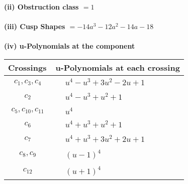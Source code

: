 \documentclass[1p]{elsarticle_modified}
\theoremstyle{definition}
\begin{document}
\flushleft \textbf{(ii) Obstruction class $= 1$}\\~\\
\flushleft \textbf{(iii) Cusp Shapes $= -14 a^3-12 a^2-14 a-18$}\\~\\
\newpage\renewcommand{\arraystretch}{1}
\flushleft \textbf{(iv) u-Polynomials at the component}\newline \\
\begin{tabular}{m{50pt}|m{274pt}}
Crossings & \hspace{64pt}u-Polynomials at each crossing \\
\hline $$\begin{aligned}c_{1},c_{3},c_{4}\end{aligned}$$&$\begin{aligned}
&u^4- u^3+3 u^2-2 u+1
\end{aligned}$\\
\hline $$\begin{aligned}c_{2}\end{aligned}$$&$\begin{aligned}
&u^4- u^3+u^2+1
\end{aligned}$\\
\hline $$\begin{aligned}c_{5},c_{10},c_{11}\end{aligned}$$&$\begin{aligned}
&u^4
\end{aligned}$\\
\hline $$\begin{aligned}c_{6}\end{aligned}$$&$\begin{aligned}
&u^4+u^3+u^2+1
\end{aligned}$\\
\hline $$\begin{aligned}c_{7}\end{aligned}$$&$\begin{aligned}
&u^4+u^3+3 u^2+2 u+1
\end{aligned}$\\
\hline $$\begin{aligned}c_{8},c_{9}\end{aligned}$$&$\begin{aligned}
&(u-1)^4
\end{aligned}$\\
\hline $$\begin{aligned}c_{12}\end{aligned}$$&$\begin{aligned}
&(u+1)^4
\end{aligned}$\\
\hline
\end{tabular}\\~\\
\end{document}
